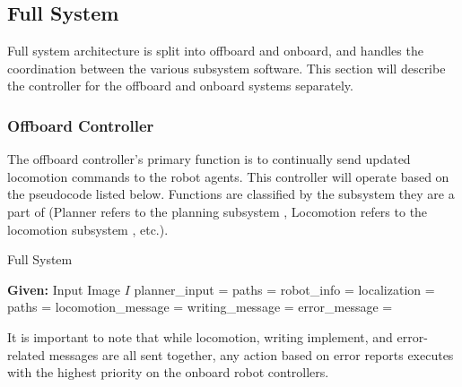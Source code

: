 
\subsection{Full System}
\label{sec:software_full_system}

Full system architecture is split into offboard and onboard, and handles the coordination between the various subsystem software. This section will describe the controller for the offboard and onboard systems separately.

\subsubsection{Offboard Controller}
\label{sec:software_full_offboard}
The offboard controller's primary function is to continually send updated locomotion commands to the robot agents. This controller will operate based on the pseudocode listed below. Functions are classified by the subsystem they are a part of (Planner refers to the planning subsystem , Locomotion refers to the locomotion subsystem , etc.).


\begin{algorithm}[t!]
\caption{Full System}\label{algo:full_system}
\begin{algorithmic}[1]  
\State \textbf{Given:} Input Image $I$ 
\State planner\_input =  
\State paths = 
\State {} 
    \State robot\_info = 
    \State localization = 
   \State paths = 
   \State locomotion\_message = 
   \State writing\_message = 
   \State error\_message = 
   \State {}
   \State {}
\EndProcedure
\end{algorithmic}
\end{algorithm}

It is important to note that while locomotion, writing implement, and error-related messages are all sent together, any action based on error reports executes with the highest priority on the onboard robot controllers.


